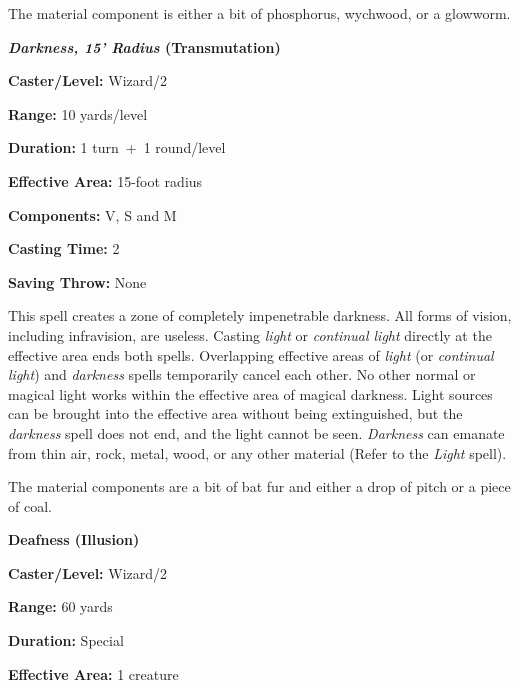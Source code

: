 \begin{multicols}{2}
The material component is either a bit of phosphorus, wychwood, or a glowworm.
 
\vspace{1em}

\noindent
\begin{minipage}{\columnwidth}

\noindent \textbf{\textit{Darkness, 15' Radius} (Transmutation)}

\noindent \textbf{Caster/Level:} Wizard/2

\noindent \textbf{Range:} 10 yards/level

\noindent \textbf{Duration:} 1 turn~+~1 round/level

\noindent \textbf{Effective Area:} 15-foot radius

\noindent \textbf{Components:} V, S and M

\noindent \textbf{Casting Time:} 2

\noindent \textbf{Saving Throw:} None

\end{minipage}

This spell creates a zone of completely impenetrable darkness.  All forms of vision, including infravision, are useless.  Casting \textit{light} or \textit{continual light} directly at the effective area ends both spells.  Overlapping effective areas of \textit{light} (or \textit{continual light}) and \textit{darkness} spells temporarily cancel each other.  No other normal or magical light works within the effective area of magical darkness.  Light sources can be brought into the effective area without being extinguished, but the \textit{darkness} spell does not end, and the light cannot be seen.  \textit{Darkness} can emanate from thin air, rock, metal, wood, or any other material (Refer to the \textit{Light} spell).  

The material components are a bit of bat fur and either a drop of pitch or a piece of coal.

\vspace{1em}

\noindent
\begin{minipage}{\columnwidth}

\noindent \textbf{Deafness (Illusion)}

\noindent \textbf{Caster/Level:} Wizard/2

\noindent \textbf{Range:} 60 yards

\noindent \textbf{Duration:} Special

\noindent \textbf{Effective Area:} 1 creature


\end{minipage}
\end{multicols}
